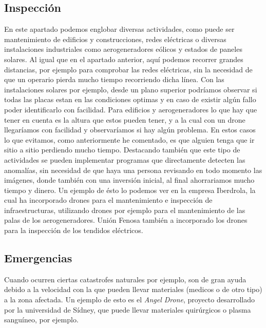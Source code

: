 	\subsection{Inspecci\'on} En este apartado podemos englobar diversas actividades, como puede ser mantenimiento de edificios y construcciones, redes el\'ectricas o diversas instalaciones industriales como aerogeneradores e\'olicos y estados de paneles solares. Al igual que en el apartado anterior, aqu\'i podemos recorrer grandes distancias, por ejemplo para comprobar las redes el\'ectricas, sin la necesidad de que un operario pierda mucho tiempo recorriendo dicha l\'inea. Con las instalaciones solares por ejemplo, desde un plano superior podr\'iamos observar si todas las placas estan en las condiciones optimas y en caso de existir alg\'un fallo poder identificarlo con facilidad. Para edificios y aerogeneradores lo que hay que tener en cuenta es la altura que estos pueden tener, y a la cual con un drone llegar\'iamos con facilidad y observar\'iamos si hay alg\'un problema. En estos casos lo que evitamos, como anteriormente he comentado, es que alguien tenga que ir sitio a sitio perdiendo mucho tiempo. Destacando tambi\'en que este tipo de actividades se pueden implementar programas que directamente detecten las anomal\'ias, sin necesidad de que haya una persona revisando en todo momento las im\'agenes, donde tambi\'en con una inversi\'on inicial, al final ahorrariamos mucho tiempo y dinero. Un ejemplo de \'esto lo podemos ver en la empresa Iberdrola, la cual ha incorporado drones para el mantenimiento e inspecci\'on de infraestructuras, utilizando drones por ejemplo para el mantenimiento de las palas de los aerogeneradores. Uni\'on Fenosa tambi\'en a incorporado los drones para la inspecci\'on de los tendidos el\'ectricos. 


	\subsection{Emergencias} Cuando ocurren ciertas catastrofes naturales por ejemplo, son de gran ayuda debido a la velocidad con la que pueden llevar materiales (medicos o de otro tipo) a la zona afectada. Un ejemplo de esto es el \textit{Angel Drone}, proyecto desarrollado por la universidad de S\'idney, que puede llevar materiales quir\'urgicos o plasma sangu\'ineo, por ejemplo.

